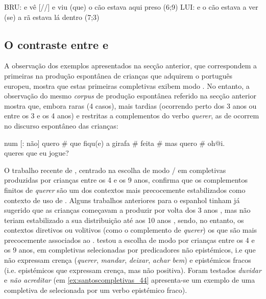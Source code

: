\documentclass[output=paper]{LSP/langsci}
\begin{document}
\ea\label{ex:santoscompletivas_42}
\ea\label{ex:santoscompletivas_42a} BRU: e vê [//] e viu (que) o cão estava aqui preso (6;9)
\ex\label{ex:santoscompletivas_42b} LUI: e o cão estava a ver (se) a rã estava lá dentro (7;3)\\
\zl

\subsection{O contraste entre  e }
\label{subsec:santoscompletivas_contraste}

A observação dos exemplos apresentados na secção anterior, que correspondem a primeiras  na produção espontânea de crianças que adquirem o português europeu, mostra que estas primeiras completivas exibem modo . No entanto, a observação do mesmo \textit{corpus} de produção espontânea referido na secção anterior mostra que, embora raras (4 casos), mais tardias (ocorrendo perto dos 3 anos ou entre os 3 e os 4 anos) e restritas a complementos do verbo \textit{querer}, as  de  ocorrem no discurso espontâneo das crianças:

\ea\label{ex:santoscompletivas_43}
\ea\label{ex:santoscompletivas_43a} num [: não] quero \# que fiqu(e) a girafa \# feita \# mas quero \# oh@i.\\
\ex\label{ex:santoscompletivas_43b} queres que eu jogue?
\zl

O trabalho recente de \citet{jesus2014}, centrado na escolha de modo  /  em completivas produzidas por crianças entre os 4 e os 9 anos, confirma que os complementos finitos de \textit{querer} são um dos contextos mais precocemente estabilizados como contexto de uso de . Alguns trabalhos anteriores para o espanhol tinham já sugerido que as crianças começavam a produzir  por volta dos 3 anos \citep{giligaya1972}, mas não teriam estabilizado a sua distribuição até aos 10 anos \citep{blake1983}, sendo, no entanto, os contextos diretivos ou volitivos (como o complemento de \textit{querer}) os que são mais precocemente associados ao  \citep{giligaya1972,blake1983}. \citet{jesus2014} testou a escolha de modo  por crianças entre os 4 e os 9 anos, em completivas selecionadas por predicadores não epistémicos, i.e que não expressam crença (\textit{querer}, \textit{mandar}, \textit{deixar}, \textit{achar bem}) e epistémicos fracos (i.e. epistémicos que expressam crença, mas não positiva). Foram testados \textit{duvidar} e \textit{não acreditar} (em \ref{ex:santoscompletivas_44} apresenta-se um exemplo de uma completiva de  selecionada por um verbo epistémico fraco).
 
\end{document}
